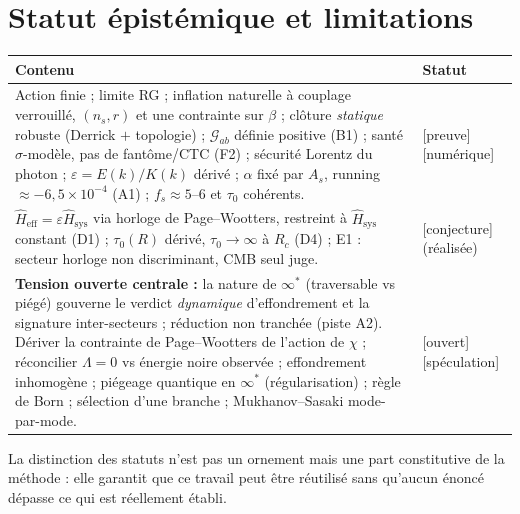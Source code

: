\documentclass[11pt,a4paper]{article}
\newcommand{\statut}[1]{{\footnotesize\textsf{[#1]}}}
\newcommand{\Heff}{\hat{H}_{\mathrm{eff}}}
\newcommand{\Hsys}{\hat{H}_{\mathrm{sys}}}
\theoremstyle{definition}
\begin{document}
\section{Statut \'epist\'emique et limitations}
\begin{table}[h]\centering\small
\begin{tabular}{p{}l}
\toprule
Contenu & Statut\\
\midrule
Action finie ; limite RG ; inflation naturelle \`a couplage verrouill\'e, $(n_s,r)$ et une
contrainte sur $\beta$ ; cl\^oture \emph{statique} robuste (Derrick $+$ topologie) ;
$\mathcal{G}_{ab}$ d\'efinie positive (B1) ; sant\'e $\sigma$-mod\`ele, pas de fant\^ome/CTC
(F2) ; s\'ecurit\'e Lorentz du photon ; $\varepsilon=E(k)/K(k)$ d\'eriv\'e ; $\alpha$ fix\'e par
$A_s$, running $\approx-6{,}5\times10^{-4}$ (A1) ; $f_s\approx5$--$6$ et $\tau_0$ coh\'erents.
& \statut{preuve}\statut{num\'erique}\\
\midrule
$\Heff=\varepsilon\Hsys$ via horloge de Page--Wootters, restreint \`a $\Hsys$ constant (D1) ;
$\tau_0(R)$ d\'eriv\'e, $\tau_0\to\infty$ \`a $R_c$ (D4) ; E1 : secteur horloge non discriminant,
CMB seul juge. & \statut{conjecture} (r\'ealis\'ee)\\
\midrule
\textbf{Tension ouverte centrale :} la nature de $\infty^*$ (traversable vs pi\'eg\'e) gouverne
le verdict \emph{dynamique} d'effondrement et la signature inter-secteurs ; r\'eduction non
tranch\'ee (piste A2). D\'eriver la contrainte de Page--Wootters de l'action de $\chi$ ;
r\'econcilier $\Lambda=0$ vs \'energie noire observ\'ee ; effondrement inhomog\`ene ; pi\'egeage
quantique en $\infty^*$ (r\'egularisation) ; r\`egle de Born ; s\'election d'une branche ;
Mukhanov--Sasaki mode-par-mode. & \statut{ouvert}\statut{sp\'eculation}\\
\bottomrule
\end{tabular}
\end{table}

\noindent La distinction des statuts n'est pas un ornement mais une part constitutive de la
m\'ethode : elle garantit que ce travail peut \^etre r\'eutilis\'e sans qu'aucun \'enonc\'e
d\'epasse ce qui est r\'eellement \'etabli.

\end{document}
